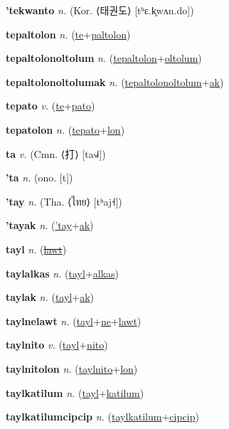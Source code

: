 \textbf{\hypertarget{'tekwanto}{'tekwanto}} \textit{n.} (Kor. ⟨{\korean{}태권도}⟩ [tʰɛ.k͈wʌn.do])


\textbf{\hypertarget{tepaltolon}{tepaltolon}} \textit{n.} (\hyperlink{te}{te}+\allowbreak \hyperlink{paltolon}{paltolon})


\textbf{\hypertarget{tepaltolonoltolum}{tepaltolonoltolum}} \textit{n.} (\hyperlink{tepaltolon}{tepaltolon}+\allowbreak \hyperlink{oltolum}{oltolum})


\textbf{\hypertarget{tepaltolonoltolumak}{tepaltolonoltolumak}} \textit{n.} (\hyperlink{tepaltolonoltolum}{tepaltolonoltolum}+\allowbreak \hyperlink{ak}{ak})


\textbf{\hypertarget{tepato}{tepato}} \textit{v.} (\hyperlink{te}{te}+\allowbreak \hyperlink{pato}{pato})


\textbf{\hypertarget{tepatolon}{tepatolon}} \textit{n.} (\hyperlink{tepato}{tepato}+\allowbreak \hyperlink{lon}{lon})


\textbf{\hypertarget{ta}{ta}} \textit{v.} (Cmn. ⟨{\chinese{}打}⟩ [ta˧˩˧])


\textbf{\hypertarget{'ta}{'ta}} \textit{n.} (ono. [t])


\textbf{\hypertarget{'tay}{'tay}} \textit{n.} (Tha. ⟨{\thai{}ไทย}⟩ [tʰaj˧])


\textbf{\hypertarget{'tayak}{'tayak}} \textit{n.} (\hyperlink{'tay}{'tay}+\allowbreak \hyperlink{ak}{ak})


\textbf{\hypertarget{tayl}{tayl}} \textit{n.} (\hyperlink{lawt}{\sout{lawt}})


\textbf{\hypertarget{taylalkas}{taylalkas}} \textit{n.} (\hyperlink{tayl}{tayl}+\allowbreak \hyperlink{alkas}{alkas})


\textbf{\hypertarget{taylak}{taylak}} \textit{n.} (\hyperlink{tayl}{tayl}+\allowbreak \hyperlink{ak}{ak})


\textbf{\hypertarget{taylnelawt}{taylnelawt}} \textit{n.} (\hyperlink{tayl}{tayl}+\allowbreak \hyperlink{ne}{ne}+\allowbreak \hyperlink{lawt}{lawt})


\textbf{\hypertarget{taylnito}{taylnito}} \textit{v.} (\hyperlink{tayl}{tayl}+\allowbreak \hyperlink{nito}{nito})


\textbf{\hypertarget{taylnitolon}{taylnitolon}} \textit{n.} (\hyperlink{taylnito}{taylnito}+\allowbreak \hyperlink{lon}{lon})


\textbf{\hypertarget{taylkatilum}{taylkatilum}} \textit{n.} (\hyperlink{tayl}{tayl}+\allowbreak \hyperlink{katilum}{katilum})


\textbf{\hypertarget{taylkatilumcipcip}{taylkatilumcipcip}} \textit{n.} (\hyperlink{taylkatilum}{taylkatilum}+\allowbreak \hyperlink{cipcip}{cipcip})


